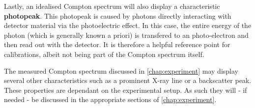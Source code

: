 Lastly, an idealised Compton spectrum will also display a characteristic 
\textbf{photopeak}. This photopeak is caused by photons directly interacting with 
detector material via the photoelectric effect. In this case, the entire energy of 
the photon (which is generally known a priori) is transfered to an photo-electron and then read out with the detector. It is 
therefore a helpful reference point for calibrations, albeit not being part of the 
Compton spectrum itself.

The measured Compton spectrum discussed in \autoref{chap:experiment} may display
several other characteristics such as a prominent X-ray line or a backscatter peak.
These properties are dependant on the experimental setup. As such they will -
if needed - be discussed in the appropriate sections of \autoref{chap:experiment}.
